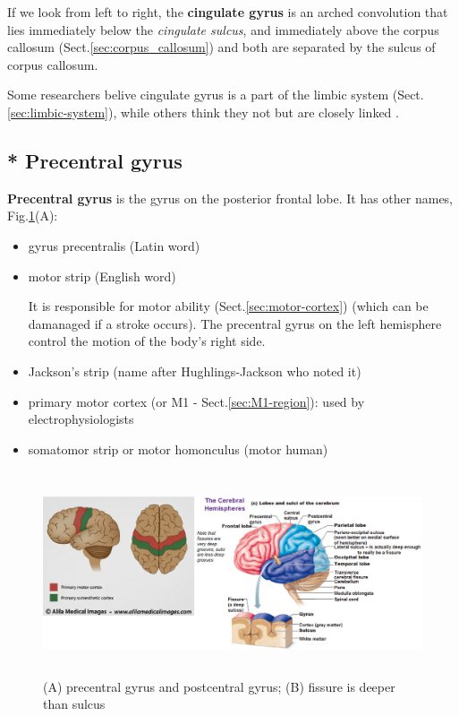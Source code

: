 If we look from left to right, the {\bf cingulate gyrus} is an arched
convolution that lies immediately below the {\it cingulate sulcus}, and
immediately above the corpus callosum (Sect.\ref{sec:corpus_callosum}) and both
are separated by the sulcus of corpus callosum.

Some researchers belive cingulate gyrus is a part of the limbic system 
(Sect.\ref{sec:limbic-system}), while others think they not but are closely
linked .


\subsection{* Precentral gyrus}
\label{sec:precentral-gyrus}


{\bf Precentral gyrus} is the gyrus on the posterior frontal lobe.
It has other names, Fig.\ref{fig:cerebral_hemispheres}(A):
\begin{itemize}
  \item gyrus precentralis (Latin word)
  \item motor strip (English word)
  
  It is responsible for motor ability (Sect.\ref{sec:motor-cortex})
(which can be damanaged if a stroke occurs). The precentral gyrus on the left
hemisphere control the motion of the body's right side. 
   
  \item Jackson's strip (name after Hughlings-Jackson who noted it)
  
  \item primary motor cortex (or M1 - Sect.\ref{sec:M1-region}): used by
  electrophysiologists
  
  \item somatomor strip or motor homonculus (motor human)
\end{itemize}


\begin{figure}[htb]
  \centerline{\includegraphics[height=6cm]{./images/cerebral_hemispheres.eps}}
  \caption{(A) precentral gyrus and postcentral
  gyrus; (B) fissure is deeper than sulcus}\label{fig:cerebral_hemispheres}
\end{figure}
 


